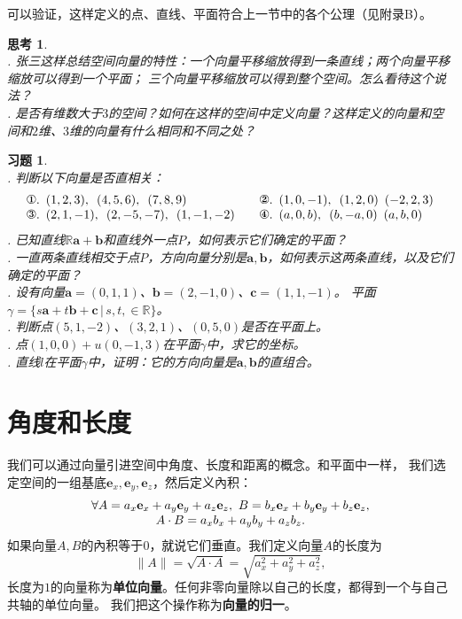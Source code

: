 \documentclass[12pt,UTF8]{ctexbook}
\newtheorem{sk}{思考}[section]
\newtheorem{xt}{习题}[section]
\begin{document}
可以验证，这样定义的点、直线、平面符合上一节中的各个公理（见附录B）。

\begin{sk}
    \mbox{}  \\
    . 张三这样总结空间向量的特性：一个向量平移缩放得到一条直线；两个向量平移缩放可以得到一个平面；
    三个向量平移缩放可以得到整个空间。怎么看待这个说法？\\
    . 是否有维数大于$3$的空间？如何在这样的空间中定义向量？这样定义的向量和空间和$2$维、$3$维的向量有什么相同和不同之处？
\end{sk}

\begin{xt}
    \mbox{}  \\
    . 判断以下向量是否直相关：\\
    $$
    \begin{array}{ll}
        \mbox{\ding{172}}.\,\,\, (1,2,3),\,\,\,(4,5,6), \,\,\,(7,8,9) \quad & \mbox{\ding{173}}.\,\,\, (1,0,-1),\,\,\, (1,2,0) \,\,\,(-2,2,3)  \\
        \mbox{\ding{174}}.\,\,\, (2,1,-1), \,\,\, (2,-5,-7), \,\,\,(1,-1,-2) \quad & \mbox{\ding{175}}.\,\,\, (a,0,b),\,\,\, (b,-a,0) \,\,\,(a,b,0) 
    \end{array}
    $$
    . 已知直线$\mathbb{R}\mathbf{a}+\mathbf{b}$和直线外一点$P$，如何表示它们确定的平面？\\
    . 一直两条直线相交于点$P$，方向向量分别是$\mathbf{a},\mathbf{b}$，如何表示这两条直线，以及它们确定的平面？\\
    . 设有向量$\mathbf{a}=(0,1,1)$、$\mathbf{b}=(2,-1,0)$、$\mathbf{c}=(1,1,-1)$。
    平面$\gamma = \{s\mathbf{a} + t\mathbf{b} + \mathbf{c} \, | \, s,t,\in\mathbb{R}\}$。\\
    . 判断点$(5,1,-2)$、$(3,2,1)$、$(0,5,0)$是否在平面上。\\
    . 点$(1,0,0)+u(0,-1,3)$在平面$\gamma$中，求它的坐标。\\
    . 直线$l$在平面$\gamma$中，证明：它的方向向量是$\mathbf{a},\mathbf{b}$的直组合。
\end{xt}

\section{角度和长度}
我们可以通过向量引进空间中角度、长度和距离的概念。和平面中一样，
我们选定空间的一组基底$\mathbf{e}_x,\mathbf{e}_y,\mathbf{e}_z$，然后定义內积：
$$
\begin{array}{c}
    \forall  A = a_x\mathbf{e}_x+a_y\mathbf{e}_y+a_z\mathbf{e}_z,\,\,B = b_x\mathbf{e}_x+b_y\mathbf{e}_y+b_z\mathbf{e}_z, \notag \\
     A\cdot B = a_xb_x + a_yb_y + a_zb_z. \notag
\end{array}
$$ 
如果向量$A,B$的內积等于$0$，就说它们垂直。我们定义向量$A$的长度为
$$\|A\| = \sqrt{A\cdot A} = \sqrt{a_x^2 + a_y^2 + a_z^2},$$
长度为$1$的向量称为\textbf{单位向量}。任何非零向量除以自己的长度，都得到一个与自己共轴的单位向量。
我们把这个操作称为\textbf{向量的归一}。
\end{document}
